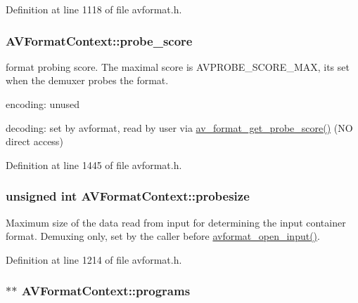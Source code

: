 Definition at line 1118 of file avformat.\+h.

\subsubsection[{\texorpdfstring{probe\+\_\+score}{probe_score}}]{ A\+V\+Format\+Context\+::probe\+\_\+score}\hypertarget{struct_a_v_format_context_a65f11f94f40f83866ebe651c8ae111cf}{}\label{struct_a_v_format_context_a65f11f94f40f83866ebe651c8ae111cf}
format probing score. The maximal score is A\+V\+P\+R\+O\+B\+E\+\_\+\+S\+C\+O\+R\+E\+\_\+\+M\+AX, its set when the demuxer probes the format.
\begin{DoxyItemize}
\item encoding\+: unused
\item decoding\+: set by avformat, read by user via \hyperlink{avformat_8h_ad332941a01e30dd7d20a25f98dd69907}{av\+\_\+format\+\_\+get\+\_\+probe\+\_\+score()} (NO direct access) 
\end{DoxyItemize}

Definition at line 1445 of file avformat.\+h.

\subsubsection[{\texorpdfstring{probesize}{probesize}}]{\setlength{\rightskip}{0pt plus 5cm}unsigned {\bf int} A\+V\+Format\+Context\+::probesize}\hypertarget{struct_a_v_format_context_afcff2757459cf56050b2d908f46957b0}{}\label{struct_a_v_format_context_afcff2757459cf56050b2d908f46957b0}
Maximum size of the data read from input for determining the input container format. Demuxing only, set by the caller before \hyperlink{group__lavf__decoding_ga10a404346c646e4ab58f4ed798baca32}{avformat\+\_\+open\+\_\+input()}. 

Definition at line 1214 of file avformat.\+h.

\subsubsection[{\texorpdfstring{programs}{programs}}]{$\ast$$\ast$ A\+V\+Format\+Context\+::programs}\hypertarget{struct_a_v_format_context_a4c2c5a4c758966349ff513e95154d062}{}\label{struct_a_v_format_context_a4c2c5a4c758966349ff513e95154d062}


